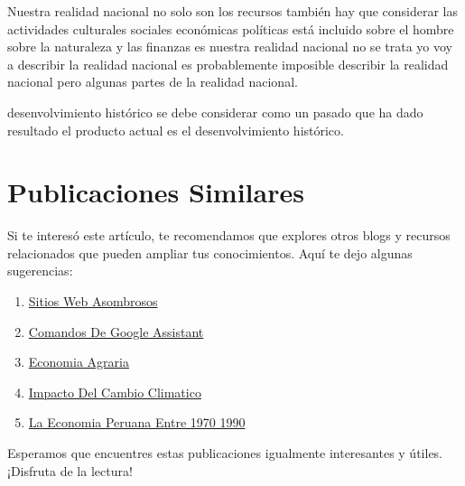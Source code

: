 \documentclass[
  jou,
  floatsintext,
  longtable,
  a4paper,
  nolmodern,
  notxfonts,
  notimes,
  12pt,
  colorlinks=true,linkcolor=blue,citecolor=blue,urlcolor=blue]{apa7}
\providecommand{\tightlist}{%
  \setlength{\itemsep}{0pt}\setlength{\parskip}{0pt}}
\begin{document}
Nuestra realidad nacional no solo son los recursos también hay que
considerar las actividades culturales sociales económicas políticas está
incluido sobre el hombre sobre la naturaleza y las finanzas es nuestra
realidad nacional no se trata yo voy a describir la realidad nacional es
probablemente imposible describir la realidad nacional pero algunas
partes de la realidad nacional.

desenvolvimiento histórico se debe considerar como un pasado que ha dado
resultado el producto actual es el desenvolvimiento histórico.

\section{Publicaciones Similares}\label{publicaciones-similares}

Si te interesó este artículo, te recomendamos que explores otros blogs y
recursos relacionados que pueden ampliar tus conocimientos. Aquí te dejo
algunas sugerencias:

\begin{enumerate}
\def\labelenumi{\arabic{enumi}.}
\tightlist
\item
  \href{https://achalmaedison.netlify.app/blog/posts/2017-04-23-sitios-web-asombrosos/index.pdf}{}
  \href{https://achalmaedison.netlify.app/blog/posts/2017-04-23-sitios-web-asombrosos}{Sitios
  Web Asombrosos}
\item
  \href{https://achalmaedison.netlify.app/blog/posts/2020-05-23-comandos-de-google-assistant/index.pdf}{}
  \href{https://achalmaedison.netlify.app/blog/posts/2020-05-23-comandos-de-google-assistant}{Comandos
  De Google Assistant}
\item
  \href{https://achalmaedison.netlify.app/blog/posts/2022-04-22-economia-agraria/index.pdf}{}
  \href{https://achalmaedison.netlify.app/blog/posts/2022-04-22-economia-agraria}{Economia
  Agraria}
\item
  \href{https://achalmaedison.netlify.app/blog/posts/2022-06-02-impacto-del-cambio-climatico/index.pdf}{}
  \href{https://achalmaedison.netlify.app/blog/posts/2022-06-02-impacto-del-cambio-climatico}{Impacto
  Del Cambio Climatico}
\item
  \href{https://achalmaedison.netlify.app/blog/posts/2023-05-12-la-economia-peruana-entre-1970-1990/index.pdf}{}
  \href{https://achalmaedison.netlify.app/blog/posts/2023-05-12-la-economia-peruana-entre-1970-1990}{La
  Economia Peruana Entre 1970 1990}
\end{enumerate}

Esperamos que encuentres estas publicaciones igualmente interesantes y
útiles. ¡Disfruta de la lectura!
\end{document}
